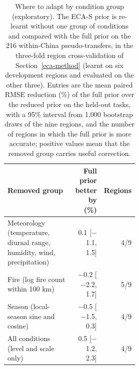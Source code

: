 \begin{table}[H]
\centering
\footnotesize
\caption{Where to adapt by condition group (exploratory). The ECA-S prior is re-learnt without one group of conditions and compared with the full prior on the 216 within-China pseudo-transfers, in the three-fold region cross-validation of Section~\ref{eca-method} (learnt on six development regions and evaluated on the other three). Entries are the mean paired RMSE reduction (\%) of the full prior over the reduced prior on the held-out tasks, with a 95\% interval from 1,000 bootstrap draws of the nine regions, and the number of regions in which the full prior is more accurate; positive values mean that the removed group carries useful correction.}
\label{tab:explore-ablation}
\setlength{\tabcolsep}{4pt}
\begin{tabular}{@{}p{0.52\linewidth}rr@{}}
\toprule
Removed group & Full prior better by (\%) & Regions \\
\midrule
Meteorology (temperature, diurnal range, humidity, wind, precipitation) & 0.1 [$-$1.1, 1.5] & 4/9 \\
Fire (log fire count within 100 km) & $-$0.2 [$-$2.2, 1.7] & 5/9 \\
Season (local-season sine and cosine) & $-$0.5 [$-$1.5, 0.3] & 4/9 \\
All conditions (level and scale only) & 0.5 [$-$1.2, 2.3] & 4/9 \\
\bottomrule
\end{tabular}
\end{table}

